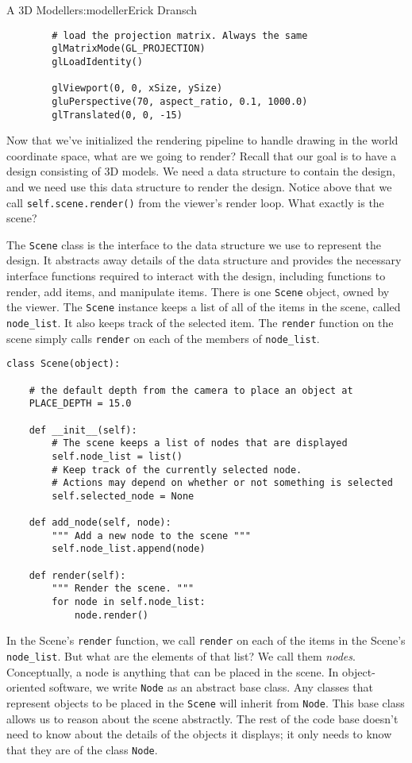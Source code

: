 \begin{aosachapter}{A 3D Modeller}{s:modeller}{Erick Dransch}
\begin{verbatim}
        # load the projection matrix. Always the same
        glMatrixMode(GL_PROJECTION)
        glLoadIdentity()

        glViewport(0, 0, xSize, ySize)
        gluPerspective(70, aspect_ratio, 0.1, 1000.0)
        glTranslated(0, 0, -15)
\end{verbatim}

\label{what-to-render-the-scene}

Now that we've initialized the rendering pipeline to handle drawing in
the world coordinate space, what are we going to render? Recall that our
goal is to have a design consisting of 3D models. We need a data
structure to contain the design, and we need use this data structure to
render the design. Notice above that we call
\texttt{self.scene.render()} from the viewer's render loop. What exactly
is the scene?

The \texttt{Scene} class is the interface to the data structure we use
to represent the design. It abstracts away details of the data structure
and provides the necessary interface functions required to interact with
the design, including functions to render, add items, and manipulate
items. There is one \texttt{Scene} object, owned by the viewer. The
\texttt{Scene} instance keeps a list of all of the items in the scene,
called \texttt{node\_list}. It also keeps track of the selected item.
The \texttt{render} function on the scene simply calls \texttt{render}
on each of the members of \texttt{node\_list}.

\begin{verbatim}
class Scene(object):

    # the default depth from the camera to place an object at
    PLACE_DEPTH = 15.0

    def __init__(self):
        # The scene keeps a list of nodes that are displayed
        self.node_list = list()
        # Keep track of the currently selected node.
        # Actions may depend on whether or not something is selected
        self.selected_node = None

    def add_node(self, node):
        """ Add a new node to the scene """
        self.node_list.append(node)

    def render(self):
        """ Render the scene. """
        for node in self.node_list:
            node.render()
\end{verbatim}

\label{nodes}

In the Scene's \texttt{render} function, we call \texttt{render} on each
of the items in the Scene's \texttt{node\_list}. But what are the
elements of that list? We call them \emph{nodes}. Conceptually, a node
is anything that can be placed in the scene. In object-oriented
software, we write \texttt{Node} as an abstract base class. Any classes
that represent objects to be placed in the \texttt{Scene} will inherit
from \texttt{Node}. This base class allows us to reason about the scene
abstractly. The rest of the code base doesn't need to know about the
details of the objects it displays; it only needs to know that they are
of the class \texttt{Node}.


\end{aosachapter}
